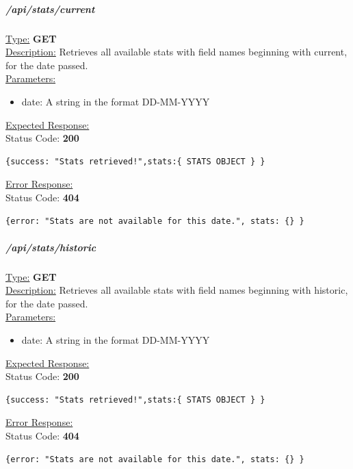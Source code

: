 \documentclass[preprint,12pt,3p]{elsarticle}
\newcommand{\forceindent}{\leavevmode{\parindent=1em\indent}}
\begin{document}
\subparagraph*{/api/stats/current}
\underline{Type:} \textbf{GET}\\

\underline{Description:} Retrieves all available stats with field names beginning with current, for the date passed.\\

\underline{Parameters:}

\begin{itemize}
\item date: A string in the format DD-MM-YYYY
\end{itemize}

\underline{Expected Response:}\\[5pt]
\forceindent Status Code: \textbf{200} \\
\begin{verbatim}
{success: "Stats retrieved!",stats:{ STATS OBJECT } }
\end{verbatim}
\underline{Error Response:}\\[5pt]
\forceindent Status Code: \textbf{404} \\
\begin{verbatim}
{error: "Stats are not available for this date.", stats: {} }
\end{verbatim}


\subparagraph*{/api/stats/historic}
\underline{Type:} \textbf{GET}\\

\underline{Description:} Retrieves all available stats with field names beginning with historic, for the date passed.\\

\underline{Parameters:}
\begin{itemize}
\item date: A string in the format DD-MM-YYYY
\end{itemize}

\underline{Expected Response:}\\[5pt]
\forceindent Status Code: \textbf{200} \\
\begin{verbatim}
{success: "Stats retrieved!",stats:{ STATS OBJECT } }
\end{verbatim}
\underline{Error Response:}\\[5pt]
\forceindent Status Code: \textbf{404} \\
\begin{verbatim}
{error: "Stats are not available for this date.", stats: {} }
\end{verbatim}
\end{document}
